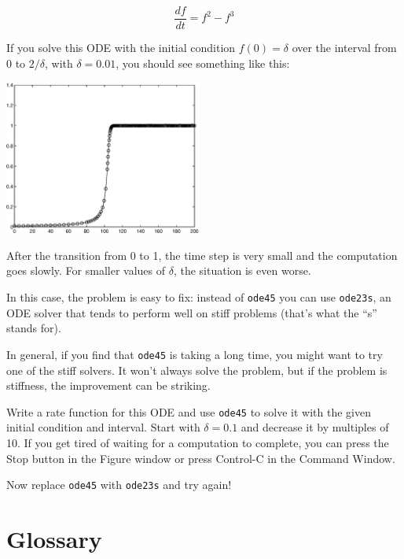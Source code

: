 \documentclass[
]{book}
\begin{document}
\begin{equation}
\frac{df}{dt} = f^2 - f^3
\end{equation}

If you solve this ODE with the initial condition $f(0) = \delta$ over
the interval from 0 to $2/\delta$, with $\delta = 0.01$, you should
see something like this:

\beforefig \centerline{\includegraphics[height=2in]{figs/stiff.eps}}

After the transition from 0 to 1, the time step is very small and the
computation goes slowly.  For smaller values of $\delta$, the
situation is even worse.

In this case, the problem is easy to fix: instead of {\tt ode45} you can
use {\tt ode23s}, an ODE solver that tends to perform well on stiff
problems (that's what the ``s'' stands for).

In general, if you find that {\tt ode45} is taking a long time, you
might want to try one of the stiff solvers.  It won't always solve
the problem, but if the problem is stiffness, the improvement can
be striking.

\begin{ex}
Write a rate function for this ODE and use
{\tt ode45} to solve it with the given initial condition and interval.
Start with $\delta = 0.1$ and decrease it by multiples of 10.  If
you get tired of waiting for a computation to complete, you can
press the Stop button in the Figure window or press Control-C in
the Command Window.

Now replace {\tt ode45} with {\tt ode23s} and try again!
\end{ex}



\section{Glossary}
\end{document}
